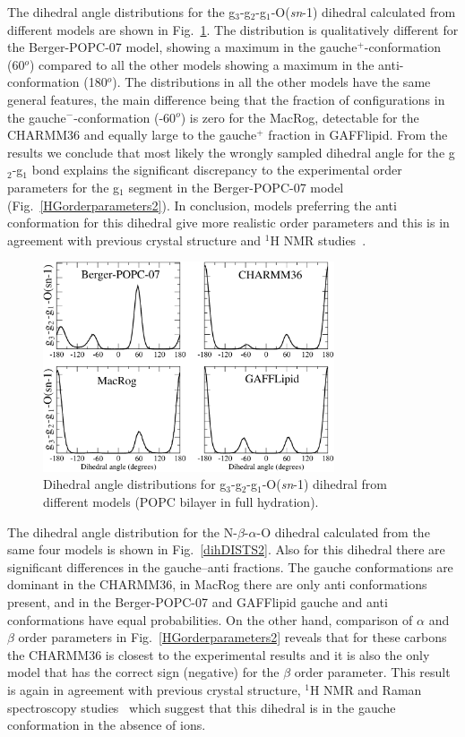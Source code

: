 \documentclass[journal=jacsat,manuscript=article]{achemso}
\begin{document}
The dihedral angle distributions for the  g$_3$-g$_2$-g$_1$-O(\textit{sn}-1) dihedral calculated from different models are
shown in Fig.~\ref{dihDISTS}. The distribution is qualitatively different for the Berger-POPC-07 model, showing a maximum in 
the gauche$^+$-conformation (60$^o$) compared to all the other models showing a maximum in the anti-conformation (180$^o$).
The distributions in all the other models have the same general features, the main difference being that the
fraction of configurations in the gauche$^-$-conformation (-60$^o$) is zero for the MacRog, detectable for the CHARMM36 and
equally large to the gauche$^+$ fraction in GAFFlipid. From the results we conclude that most likely the wrongly sampled
dihedral angle for the g$_2$-g$_1$ bond explains the significant discrepancy to the experimental order parameters
for the g$_1$ segment in the Berger-POPC-07 model (Fig.~\ref{HGorderparameters2}). 
In conclusion, models preferring the anti conformation for this dihedral give more realistic order parameters and
this is in agreement with previous crystal structure and $^1$H NMR studies~\cite{hauser80,hauser81,hauser81b,hauser88,pascher92,marsh06}.
\begin{figure}[]
  \centering
  \includegraphics[width=8.6cm]{../Fig/g1-g2_Cdihs2.pdf}
  \caption{\label{dihDISTS}
    Dihedral angle distributions for g$_3$-g$_2$-g$_1$-O(\textit{sn}-1) dihedral from different models (POPC bilayer in full hydration).
      } 
\end{figure}

The dihedral angle distribution for the  N-$\beta$-$\alpha$-O dihedral calculated from the same four models is 
shown in Fig.~\ref{dihDISTS2}. Also for this dihedral there are significant differences in the gauche--anti fractions.
The gauche conformations are dominant in the CHARMM36, in MacRog there are only anti conformations present,
and in the Berger-POPC-07 and GAFFlipid gauche and anti conformations have equal probabilities. 
On the other hand, comparison of $\alpha$ and $\beta$ order parameters in Fig.~\ref{HGorderparameters2}
reveals that for these carbons the CHARMM36 is closest to the experimental results and it is also the only model that has the correct
sign (negative) for the $\beta$ order parameter. This result is again in agreement with previous 
crystal structure, $^1$H NMR and Raman spectroscopy studies~\cite{hauser80,hauser81,hauser81b,akutsu81b} which suggest that
this dihedral is in the gauche conformation in the absence of ions.
\end{document}
